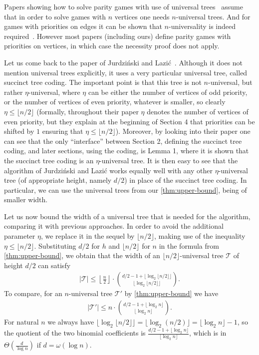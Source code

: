 \documentclass[envcountsect,envcountsame]{llncs}
\newcommand{\Tt}{\mathcal{T}}
\newcommand{\floor}[1]{\lfloor#1\rfloor}
\begin{document}
	Papers showing how to solve parity games with use of universal trees~\cite{fijalkow,Strahler-number,Zielonka-Parys-universal,symmetric-lifting}
	assume that in order to solve games with $n$ vertices one needs $n$-universal trees.
	And for games with priorities on edges it can be shown that $n$-universality is indeed required~\cite{universal-trees,fixpoints}.
	However most papers (including ours) define parity games with priorities on vertices, in which case the necessity proof does not apply.

	Let us come back to the paper of Jurdziński and Lazić~\cite{progress-measure}.
	Although it does not mention universal trees explicitly, it uses a very particular universal tree,
	called succinct tree coding.
	The important point is that this tree is not $n$-universal, but rather $\eta$-universal, where $\eta$ can be either the number of vertices of odd priority,
	or the number of vertices of even priority, whatever is smaller, so clearly $\eta\leq\floor{n/2}$
	(formally, throughout their paper $\eta$ denotes the number of vertices of even priority,
	but they explain at the beginning of Section 4 that priorities can be shifted by $1$ ensuring that $\eta\leq\floor{n/2}$).
	Moreover, by looking into their paper one can see that the only ``interface'' between Section 2, defining the succinct tree coding,
	and later sections, using the coding, is Lemma 1, where it is shown that the succinct tree coding is an $\eta$-universal tree.
	It is then easy to see that the algorithm of Jurdziński and Lazić works equally well with any other $\eta$-universal tree (of appropriate height, namely $d/2$)
	in place of the succinct tree coding.
	In particular, we can use the universal trees from our \cref{thm:upper-bound}, being of smaller width.

	Let us now bound the width of a universal tree that is needed for the algorithm, comparing it with previous approaches.
	In order to avoid the additional parameter $\eta$, we replace it in the sequel by $\floor{n/2}$, making use of the inequality $\eta\leq\floor{n/2}$.
	Substituting $d/2$ for $h$ and $\floor{n/2}$ for $n$ in the formula from \cref{thm:upper-bound}, we obtain that the width of an $\floor{n/2}$-universal tree $\Tt$ of height $d/2$ can satisfy
	\begin{align*}
		|\Tt| \leq \left\lfloor\frac{n}{2}\right\rfloor\cdot\binom{d/2 - 1 + \floor{\log_2 \floor{n/2}}}{\floor{\log_2 \floor{n/2}}}.
	\end{align*}
	To compare, for an $n$-universal tree $\Tt'$ by \cref{thm:upper-bound} we have
	\begin{align*}
		|\Tt'| \leq n\cdot\binom{d/2 - 1 + \floor{\log_2 n}}{\floor{\log_2 n}}.
	\end{align*}
	For natural $n$ we always have $\floor{\log_2 \floor{n/2}}=\floor{\log_2(n/2)}=\floor{\log_2 n}-1$,
	so the quotient of the two binomial coefficients is $\frac{d/2 - 1 + \floor{\log_2 n}}{\floor{\log_2 n}}$,
	which is in $\Theta\left(\frac{d}{\log n}\right)$ if $d=\omega(\log n)$.
\end{document}
